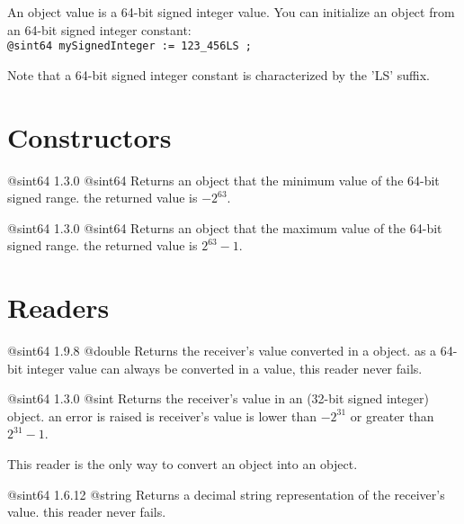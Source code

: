 

An  object value is a 64-bit signed integer value. You can initialize an  object from an 64-bit signed integer constant:\\

\texttt{@sint64 mySignedInteger := 123\_456LS ;}

Note that a 64-bit signed integer constant is characterized by the 'LS' suffix.

\section{Constructors}


{@sint64}
{1.3.0}
{@sint64}
{Returns an  object that the minimum value of the 64-bit signed range.}
{the returned value is $-2^{63}$.}





{@sint64}
{1.3.0}
{@sint64}
{Returns an  object that the maximum value of the 64-bit signed range.}
{the returned value is $2^{63}-1$.}


\section{Readers}


{@sint64}
{1.9.8}
{@double}
{Returns the receiver's value converted in a  object.}
{as a 64-bit integer value can always be converted in a  value, this reader never fails.}




{@sint64}
{1.3.0}
{@sint}
{Returns the receiver's value in an  (32-bit signed integer) object.}
{an error is raised is receiver's value is lower than $-2^{31}$ or greater than $2^{31}-1$.}

This reader is the only way to convert an  object into an  object.





{@sint64}
{1.6.12}
{@string}
{Returns a decimal string representation of the receiver's value.}
{this reader never fails.}








